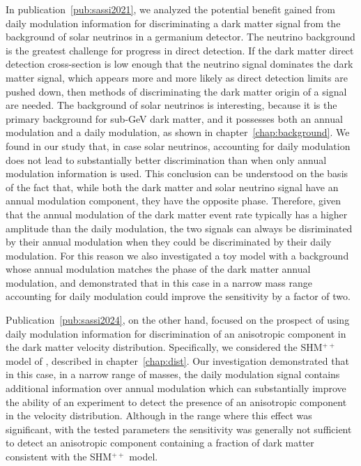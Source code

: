 \documentclass[b5paper, 10pt, twoside]{book}
\begin{document}
In publication~\ref{pub:sassi2021}, we analyzed the potential benefit gained from daily modulation information for discriminating a dark matter signal from the background of solar neutrinos in a germanium detector. The neutrino background is the greatest challenge for progress in direct detection. If the dark matter direct detection cross-section is low enough that the neutrino signal dominates the dark matter signal, which appears more and more likely as direct detection limits are pushed down, then methods of discriminating the dark matter origin of a signal are needed. The background of solar neutrinos is interesting, because it is the primary background for sub-GeV dark matter, and it possesses both an annual modulation and a daily modulation, as shown in chapter~\ref{chap:background}. We found in our study that, in case solar neutrinos, accounting for daily modulation does not lead to substantially better discrimination than when only annual modulation information is used. This conclusion can be understood on the basis of the fact that, while both the dark matter and solar neutrino signal have an annual modulation component, they have the opposite phase. Therefore, given that the annual modulation of the dark matter event rate typically has a higher amplitude than the daily modulation, the two signals can always be disriminated by their annual modulation when they could be discriminated by their daily modulation. For this reason we also investigated a toy model with a background whose annual modulation matches the phase of the dark matter annual modulation, and demonstrated that in this case in a narrow mass range accounting for daily modulation could improve the sensitivity by a factor of two.

Publication~\ref{pub:sassi2024}, on the other hand, focused on the prospect of using daily modulation information for discrimination of an anisotropic component in the dark matter velocity distribution. Specifically, we considered the SHM$^{++}$ model of \textcite{EvansOHareMcCabe2019}, described in chapter~\ref{chap:dist}. Our investigation demonstrated that in this case, in a narrow range of masses, the daily modulation signal contains additional information over annual modulation which can substantially improve the ability of an experiment to detect the presence of an anisotropic component in the velocity distribution. Although in the range where this effect was significant, with the tested parameters the sensitivity was generally not sufficient to detect an anisotropic component containing a fraction of dark matter consistent with the SHM$^{++}$ model.
\end{document}
